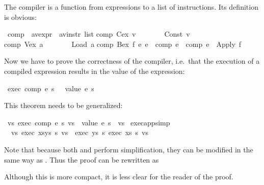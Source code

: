 \begin{isabellebody}
\begin{isamarkuptext}
The compiler is a function from expressions to a list of instructions. Its
definition is obvious:%
\end{isamarkuptext}%
\isamarkuptrue%
\ comp\ {\isacharcolon}{\isacharcolon}\ {\isachardoublequote}{\isacharparenleft}{\isacharprime}a{\isacharcomma}{\isacharprime}v{\isacharparenright}expr\ {\isasymRightarrow}\ {\isacharparenleft}{\isacharprime}a{\isacharcomma}{\isacharprime}v{\isacharparenright}instr\ list{\isachardoublequote}\isanewline
\isamarkupfalse%
\isanewline
{\isachardoublequote}comp\ {\isacharparenleft}Cex\ v{\isacharparenright}\ \ \ \ \ \ \ {\isacharequal}\ {\isacharbrackleft}Const\ v{\isacharbrackright}{\isachardoublequote}\isanewline
{\isachardoublequote}comp\ {\isacharparenleft}Vex\ a{\isacharparenright}\ \ \ \ \ \ \ {\isacharequal}\ {\isacharbrackleft}Load\ a{\isacharbrackright}{\isachardoublequote}\isanewline
{\isachardoublequote}comp\ {\isacharparenleft}Bex\ f\ e{}\ e{}{\isacharparenright}\ {\isacharequal}\ {\isacharparenleft}comp\ e{}{\isacharparenright}\ {\isacharat}\ {\isacharparenleft}comp\ e{}{\isacharparenright}\ {\isacharat}\ {\isacharbrackleft}Apply\ f{\isacharbrackright}{\isachardoublequote}\isamarkupfalse%
%
\begin{isamarkuptext}%
Now we have to prove the correctness of the compiler, i.e.\ that the
execution of a compiled expression results in the value of the expression:%
\end{isamarkuptext}%
\isamarkuptrue%
\ {\isachardoublequote}exec\ {\isacharparenleft}comp\ e{\isacharparenright}\ s\ {\isacharbrackleft}{\isacharbrackright}\ {\isacharequal}\ {\isacharbrackleft}value\ e\ s{\isacharbrackright}{\isachardoublequote}\isamarkupfalse%
\isamarkupfalse%
%
\begin{isamarkuptext}%
\noindent
This theorem needs to be generalized:%
\end{isamarkuptext}%
\isamarkuptrue%
\ {\isachardoublequote}{\isasymforall}vs{\isachardot}\ exec\ {\isacharparenleft}comp\ e{\isacharparenright}\ s\ vs\ {\isacharequal}\ {\isacharparenleft}value\ e\ s{\isacharparenright}\ {\isacharhash}\ vs{\isachardoublequote}\isamarkupfalse%
\isamarkuptrue%
\isamarkupfalse%
\ exec{\isacharunderscore}app{\isacharbrackleft}simp{\isacharbrackright}{\isacharcolon}\isanewline
\ \ {\isachardoublequote}{\isasymforall}vs{\isachardot}\ exec\ {\isacharparenleft}xs{\isacharat}ys{\isacharparenright}\ s\ vs\ {\isacharequal}\ exec\ ys\ s\ {\isacharparenleft}exec\ xs\ s\ vs{\isacharparenright}{\isachardoublequote}\isamarkupfalse%
\isamarkuptrue%
\isamarkupfalse%
\isamarkupfalse%
%
\begin{isamarkuptext}%
\noindent
Note that because both  and  perform simplification, they can
be modified in the same way as .  Thus the proof can be
rewritten as%
\end{isamarkuptext}%
\isamarkuptrue%
\isamarkupfalse%
\isamarkupfalse%
\isamarkupfalse%
\isamarkupfalse%
%
\begin{isamarkuptext}%
\noindent
Although this is more compact, it is less clear for the reader of the proof.


\end{isamarkuptext}
\end{isabellebody}
